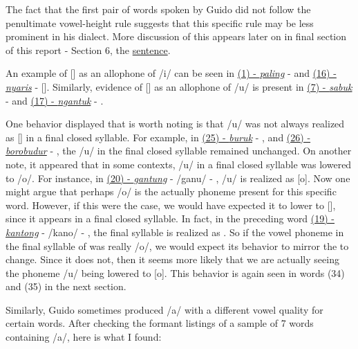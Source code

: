 \documentclass[a4paper, 12pt]{article}
\begin{document}
\bigskip

The fact that the first pair of words spoken by Guido did not follow the penultimate vowel-height rule suggests that this specific rule may be less prominent in his dialect. More discussion of this appears later on in final section of this report - Section 6, the \hyperlink{sentence}{sentence}.

\bigskip

An example of [\textsci] as an allophone of /i/ can be seen in \hyperlink{paling}{(1) - \textit{paling}} -  and \hyperlink{nyaris}{(16) - \textit{nyaris}} - []. Similarly, evidence of [\textupsilon] as an allophone of /u/ is present in \hyperlink{sabuk}{(7) - \textit{sabuk}} - \textipa{[sa"b{\textupsilon}P]} and \hyperlink{ngantuk}{(17) - \textit{ngantuk}} - \textipa{[Nan"\|[t{\textupsilon}P]}. 

\bigskip

One behavior displayed that is worth noting is that /u/ was not always realized as [\textupsilon] in a final closed syllable. For example, in \hyperlink{buruk}{(25) - \textit{buruk}} - \textipa{[bu"ruP]}, and \hyperlink{borobudur}{(26) - \textit{borobudur}} - , the /u/ in the final closed syllable remained unchanged. On another note, it appeared that in some contexts, /u/ in a final closed syllable was lowered to /o/. For instance, in \hyperlink{gantung}{(20) - \textit{gantung}} - /gan\textipa{\|[t}u/ - \textipa{["gan\|[toN]}, /u/ is realized as [o]. Now one might argue that perhaps /o/ is the actually phoneme present for this specific word. However, if this were the case, we would have expected it to lower to [\textopeno], since it appears in a final closed syllable. In fact, in the preceding word \hyperlink{kantong}{(19) - \textit{kantong}} - /kan\textipa{\|[t}o/ - \textipa{["kan\|[tON]}, the final syllable \textipa{/\|[toN/} is realized as \textipa{[\|[tON]}. So if the vowel phoneme in the final syllable of \textipa{["gan\|[toN]} was really /o/, we would expect its behavior to mirror the \textipa{/\|[toN/} to \textipa{[\|[tON]} change. Since it does not, then it seems more likely that we are actually seeing the phoneme /u/ being lowered to [o]. This behavior is again seen in words (34) and (35) in the next section.

\bigskip

Similarly, Guido sometimes produced /a/ with a different vowel quality for certain words. After checking the formant listings of a sample of 7 words containing /a/, here is what I found: \\
\end{document}
